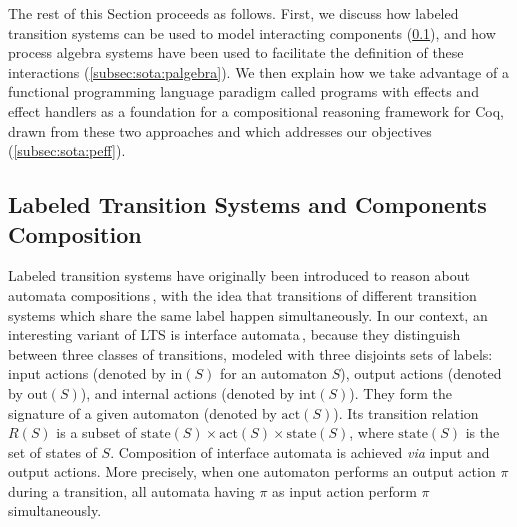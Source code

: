 The rest of this Section proceeds as follows.
%
First, we discuss how labeled transition systems can be used to model
interacting components (\ref{subsec:sota:ioauto}), and how process algebra
systems have been used to facilitate the definition of these interactions
(\ref{subsec:sota:palgebra}).
%
We then explain how we take advantage of a functional programming language
paradigm called programs with effects and effect handlers as a foundation for a
compositional reasoning framework for Coq, drawn from these two approaches and which
addresses our objectives (\ref{subsec:sota:peff}).

\subsection{Labeled Transition Systems and Components Composition}
\label{subsec:sota:ioauto}

Labeled transition systems have originally been introduced to reason about
automata compositions\,\cite{loiseaux1995lts}, with the idea that transitions of
different transition systems which share the same label happen simultaneously.
%
In our context, an interesting variant of LTS is interface
automata\,\cite{de2001interfaceautomata}, because they distinguish between three
classes of transitions, modeled with three disjoints sets of labels: input
actions (denoted by \( \mathrm{in}(S) \) for an automaton \( S \)), output
actions (denoted by \( \mathrm{out}(S) \)), and internal actions (denoted by
\( \mathrm{int}(S) \)).
%
They form the signature of a given automaton (denoted by \( \mathrm{act}(S) \)).
%
Its transition relation \( R(S) \) is a subset of
\( \mathrm{state}(S) \times \mathrm{act}(S) \times \mathrm{state}(S) \), where
\( \mathrm{state}(S) \) is the set of states of \( S \).
%
Composition of interface automata is achieved \emph{via} input and output
actions.
%
More precisely, when one automaton performs an output action \( \pi \) during a
transition, all automata having \( \pi \) as input action perform \( \pi \)
simultaneously.

